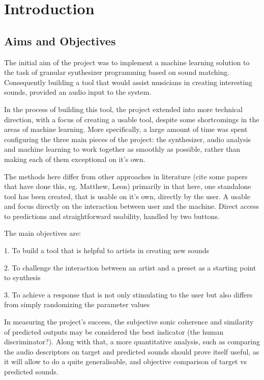 \chapter{Introduction}

\section{Aims and Objectives}

The initial aim of the project was to implement a machine learning solution to
the task of granular synthesizer programming based on sound matching.
Consequently building a tool that would assist musicians in creating interesting
sounds, provided an audio input to the system.

In the process of building this tool, the project extended into more
technical direction, with a focus of creating a usable tool, despite
some shortcomings in the areas of machine learning. More specifically,
a large amount of time was spent configuring the three main pieces of
the project: the synthesizer, audio analysis and machine learning to
work together as smoothly as possible, rather than making each of them
exceptional on it's own.

The methods here differ from other approaches in literature (cite some
papers that have done this, eg. Matthew, Leon) primarily in that here,
one standalone tool has been created, that is usable on it's own,
directly by the user. A usable and focus directly on the interaction between
user and the machine. Direct access to predictions and straightforward
usability, handled by two buttons.

The main objectives are:

1. To build a tool that is helpful to artists in creating new sounds 

2. To challenge the interaction between an artist and a preset as a starting
point to synthesis 

3. To achieve a response that is not only stimulating to the user but also differs
from simply randomizing the parameter values 

In measuring the project's success, the subjective sonic coherence and
similarity of predicted outputs may be considered the best indicator (the
human discriminator?). Along with that, a more quantitative analysis, such as comparing
the audio descriptors on target and predicted sounds should prove itself useful,
as it will allow to do a quite generalisable, and objective comparison of target
vs predicted sounds.  

